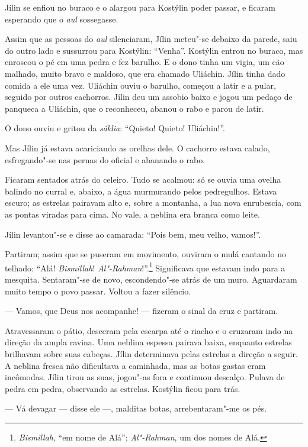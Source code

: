 Jílin se enfiou no buraco e o alargou para Kostýlin poder passar, e
ficaram esperando que o \emph{aul} sossegasse.

Assim que as pessoas do \emph{aul} silenciaram, Jílin meteu"-se debaixo
da parede, saiu do outro lado e sussurrou para Kostýlin: ``Venha''.
Kostýlin entrou no buraco, mas enroscou o pé em uma pedra e fez barulho.
E o dono tinha um vigia, um cão malhado, muito bravo e maldoso, que era
chamado Uliáchin. Jílin tinha dado comida a ele uma vez. Uliáchin ouviu
o barulho, começou a latir e a pular, seguido por outros cachorros.
Jílin deu um assobio baixo e jogou um pedaço de panqueca a Uliáchin, que
o reconheceu, abanou o rabo e parou de latir.

O dono ouviu e gritou da \emph{sáklia}: ``Quieto! Quieto! Uliáchin!''.

Mas Jílin já estava acariciando as orelhas dele. O cachorro
estava calado, esfregando"-se nas pernas do oficial e abanando o rabo.

Ficaram sentados atrás do celeiro. Tudo se acalmou: só se ouvia uma
ovelha balindo no curral e, abaixo, a água murmurando pelos pedregulhos.
Estava escuro; as estrelas pairavam alto e, sobre a montanha, a lua nova
enrubescia, com as pontas viradas para cima. No vale, a neblina era
branca como leite.

Jílin levantou"-se e disse ao camarada: ``Pois bem, meu velho, vamos!''.

Partiram; assim que se puseram em movimento, ouviram o mulá cantando no
telhado: ``Alá! \emph{Bismillah}! \emph{Al"-Rahman}!''.\footnote{\emph{Bismillah},
  ``em nome de Alá''; \emph{Al"-Rahman}, um dos nomes de Alá.}
Significava que estavam indo para a mesquita. Sentaram"-se de novo,
escondendo"-se atrás de um muro. Aguardaram muito tempo o povo passar.
Voltou a fazer silêncio.

--- Vamos, que Deus nos acompanhe! --- fizeram o sinal da cruz e
partiram.

Atravessaram o pátio, desceram pela escarpa até o riacho e o cruzaram
indo na direção da ampla ravina. Uma neblina espessa pairava baixa,
enquanto estrelas brilhavam sobre suas cabeças. Jílin determinava pelas
estrelas a direção a seguir. A neblina fresca não dificultava a
caminhada, mas as botas gastas eram incômodas. Jílin tirou as suas,
jogou"-as fora e continuou descalço. Pulava de pedra em pedra, observando
as estrelas. Kostýlin ficou para trás.

--- Vá devagar --- disse ele ---, malditas botas, arrebentaram"-me os
pés.

